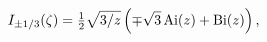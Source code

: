 \[\mathop{I_{\pm 1/3}\/}\nolimits\!\left(\zeta\right)=\tfrac{1}{2}\sqrt{3/z}%
\left(\mp\sqrt{3}\mathop{\mathrm{Ai}\/}\nolimits\!\left(z\right)+\mathop{%
\mathrm{Bi}\/}\nolimits\!\left(z\right)\right),\]